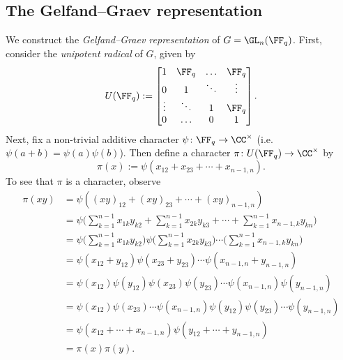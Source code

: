 
\subsection{The Gelfand--Graev representation}\label{Section2.4}
We construct the \emph{Gelfand--Graev representation} of $G=\GL_n(\FF_q)$.
First, consider the \emph{unipotent radical} of $G$, given by
\[
    U(\FF_q) := \begin{bmatrix}
        1      & \FF_q  & \hdots & \FF_q  \\
        0      & 1      & \ddots & \vdots \\
        \vdots & \ddots & 1      & \FF_q  \\
        0      & \hdots & 0      & 1
    \end{bmatrix}.
\]
Next, fix a non-trivial additive character $\psi\colon \FF_q\to\CC^\times$ (i.e.\ $\psi(a+b)=\psi(a)\psi(b)$).
Then define a character $\pi\colon U(\FF_q)\to\CC^\times$ by
\[
    \pi(x) := \psi(x_{12}+x_{23}+\cdots+x_{n-1,n}).
\]
To see that $\pi$ is a character, observe
\begin{align*}
    \pi(xy) & = \psi((xy)_{12} + (xy)_{23} + \cdots + (xy)_{n-1,n})                                                                                          \\
            & = \psi\bigg(\sum_{k=1}^{n-1} x_{1k}y_{k2} + \sum_{k=1}^{n-1} x_{2k}y_{k3} + \cdots + \sum_{k=1}^{n-1} x_{n-1,k}y_{kn}\bigg)                    \\
            & = \psi\bigg(\sum_{k=1}^{n-1} x_{1k}y_{k2}\bigg)\psi\bigg(\sum_{k=1}^{n-1} x_{2k}y_{k3}\bigg)\cdots\bigg(\sum_{k=1}^{n-1} x_{n-1,k}y_{kn}\bigg) \\
            & = \psi(x_{12}+y_{12})\psi(x_{23}+y_{23})\cdots\psi(x_{n-1,n}+y_{n-1,n})                                                                        \\
            & = \psi(x_{12})\psi(y_{12})\psi(x_{23})\psi(y_{23})\cdots\psi(x_{n-1,n})\psi(y_{n-1,n})                                                         \\
            & = \psi(x_{12})\psi(x_{23})\cdots\psi(x_{n-1,n})\psi(y_{12})\psi(y_{23})\cdots\psi(y_{n-1,n})                                                   \\
            & = \psi(x_{12} + \cdots + x_{n-1,n})\psi(y_{12} + \cdots + y_{n-1,n})                                                                           \\
            & = \pi(x)\pi(y).
\end{align*}
